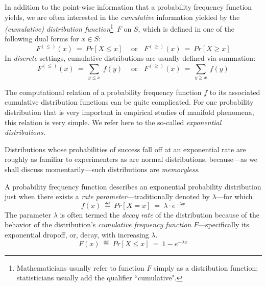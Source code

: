 \bigskip

 

In addition to the point-wise information that a probability frequency function yields, we are
often interested in the {\em cumulative} information yielded by the 
{\it (cumulative) distribution function}\footnote{Mathematicians usually refer to function $F$
simply as a distribution function; statisticians usually add the qualifier ``cumulative".}~$F$ 
on $S$, which is defined in one of the following dual forms for $x \in S$:
\[ F^{(\leq)}(x) \ = \ Pr[X \leq x] \ \ \ \ \mbox{ or} \ \ \ \  F^{(\geq)}(x) \ = \ Pr[X \geq x]\]
In {\em discrete} settings, cumulative distributions are usually defined via summation:
\[ F^{(\leq)}(x) \ = \ \sum_{y \leq x} \ f(y)  \ \ \ \ \mbox{ or} \ \ \ \ F^{(\geq)}(x) \ = \ \sum_{y \geq x} \ f(y) \]


The computational relation of a probability frequency function $f$ to its associated cumulative distribution functions can be quite complicated.  For one probability distribution that is very important in empirical studies of manifold phenomena, this relation is very simple.  We refer here to the so-called {\em exponential distributions.}

\bigskip


Distributions whose probabilities of success fall off at an exponential rate are roughly as familiar to experimenters as are normal distributions, because---as we shall discuss momentarily---such distributions are {\em memoryless}.

A probability frequency function describes an exponential probability distribution just when there exists a {\em rate parameter}---traditionally denoted by $\lambda$---for which
\[ f(x) \ \eqdef \ Pr[X=x] \ = \ \lambda \cdot e^{-\lambda x} \]
The parameter $\lambda$ is often termed the {\em decay rate} of the distribution because of the behavior of the distribution's {\em cumulative frequency function} $F$---specifically its exponential dropoff, or, decay, with increasing $\lambda$.
\[ F(x) \ \eqdef \ Pr[X \leq x] \ = \ 1 - e^{-\lambda x} \]

